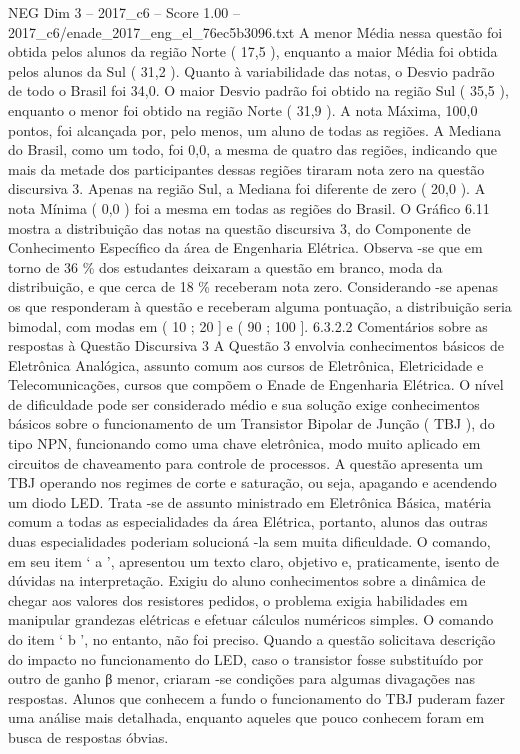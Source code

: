 \begin{textsample}{NEG Dim 3 – 2017\_c6 – Score 1.00 – 2017\_c6/enade\_2017\_eng\_el\_76ec5b3096.txt}
A menor Média nessa questão foi obtida pelos alunos da região Norte ( 17,5 ), enquanto a maior Média foi obtida pelos alunos da Sul ( 31,2 ).
Quanto à variabilidade das notas, o Desvio padrão de todo o Brasil foi 34,0.
O maior Desvio padrão foi obtido na região Sul ( 35,5 ), enquanto o menor foi obtido na região Norte ( 31,9 ).
A nota Máxima, 100,0 pontos, foi alcançada por, pelo menos, um aluno de todas as regiões.
A Mediana do Brasil, como um todo, foi 0,0, a mesma de quatro das regiões, indicando que mais da metade dos participantes dessas regiões tiraram nota zero na questão discursiva 3.
Apenas na região Sul, a Mediana foi diferente de zero ( 20,0 ).
A nota Mínima ( 0,0 ) foi a mesma em todas as regiões do Brasil.
O Gráfico 6.11 mostra a distribuição das notas na questão discursiva 3, do Componente de Conhecimento Específico da área de Engenharia Elétrica.
Observa -se que em torno de 36 \% dos estudantes deixaram a questão em branco, moda da distribuição, e que cerca de 18 \% receberam nota zero.
Considerando -se apenas os que responderam à questão e receberam alguma pontuação, a distribuição seria bimodal, com modas em ( 10 ; 20 ] e ( 90 ; 100 ]. 6.3.2.2 Comentários sobre as respostas à Questão Discursiva 3 A Questão 3 envolvia conhecimentos básicos de Eletrônica Analógica, assunto comum aos cursos de Eletrônica, Eletricidade e Telecomunicações, cursos que compõem o Enade de Engenharia Elétrica.
O nível de dificuldade pode ser considerado médio e sua solução exige conhecimentos básicos sobre o funcionamento de um Transistor Bipolar de Junção ( TBJ ), do tipo NPN, funcionando como uma chave eletrônica, modo muito aplicado em circuitos de chaveamento para controle de processos.
A questão apresenta um TBJ operando nos regimes de corte e saturação, ou seja, apagando e acendendo um diodo LED.
Trata -se de assunto ministrado em Eletrônica Básica, matéria comum a todas as especialidades da área Elétrica, portanto, alunos das outras duas especialidades poderiam solucioná -la sem muita dificuldade.
O comando, em seu item ‘ a ’, apresentou um texto claro, objetivo e, praticamente, isento de dúvidas na interpretação.
Exigiu do aluno conhecimentos sobre a dinâmica de chegar aos valores dos resistores pedidos, o problema exigia habilidades em manipular grandezas elétricas e efetuar cálculos numéricos simples.
O comando do item ‘ b ’, no entanto, não foi preciso.
Quando a questão solicitava descrição do impacto no funcionamento do LED, caso o transistor fosse substituído por outro de ganho β menor, criaram -se condições para algumas divagações nas respostas.
Alunos que conhecem a fundo o funcionamento do TBJ puderam fazer uma análise mais detalhada, enquanto aqueles que pouco conhecem foram em busca de respostas óbvias.

\end{textsample}
